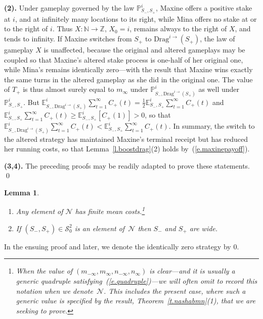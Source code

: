 \documentclass[letterpaper,11pt,oneside,reqno]{amsbook}
\newcommand{\PP}{\ensuremath{\mathbb{P}}}
\newcommand{\N}{\ensuremath{\mathbb{N}}}
\newcommand{\Z}{\ensuremath{\mathbb{Z}}}
\newcommand{\E}[0]{\mathbb{E}}
\numberwithin{figure}{chapter}
\newtheorem{lemma}[theorem]{Lemma}
\theoremstyle{definition}
\theoremstyle{definition}
\theoremstyle{definition}
\theoremstyle{definition}
\theoremstyle{definition}
\newcommand{\mc}{\mathcal}
\newcommand{\tis}{\mc{S}_0}
\newcommand\pgameplay[3]{\PP^{#3}_{#1,#2}}
\newcommand\egameplay[3]{\E^{#3}_{#1,#2}}
\newcommand{\drag}{\textrm{Drag}}
\begin{document}
{\bf (2).} Under gameplay governed by the law $\pgameplay{S_-}{S_+}{i}$, Maxine offers a positive stake at $i$, and at infinitely many locations to its right, while Mina offers no stake at or to the right of $i$.
Thus $X:\N \to \Z$, $X_0 = i$, remains always to the right of $X$, and tends to infinity. If Maxine switches from  $S_+$ to $\drag^{i\rightarrow}(S_+)$, the law of gameplay $X$ is unaffected, because the original and altered gameplays may be coupled so that Maxine's altered stake process is one-half of her original one, while Mina's remains identically zero---with the result that Maxine wins exactly the same turns in the altered gameplay as she did in the original one. The value of $T_+$ is thus almost surely equal to $m_\infty$
under 
  $\pgameplay{S_-}{\drag^{i\rightarrow}(S_+)}{i}$ as well under  $\pgameplay{S_-}{S_+}{i}$. But  
  $\egameplay{S_-}{\drag^{i\rightarrow}(S_+)}{i} \sum_{t=1}^\infty C_+(t) 
  = \tfrac{1}{2} \egameplay{S_-}{S_+}{i} \sum_{t=1}^\infty C_+(t) $ and $\egameplay{S_-}{S_+}{i} \sum_{t=1}^\infty C_+(t) \geq  \egameplay{S_-}{S_+}{i} [C_+(1)] > 0$, so that $\egameplay{S_-}{\drag^{i\rightarrow}(S_+)}{i} \sum_{t=1}^\infty C_+(t) <  \egameplay{S_-}{S_+}{i} \sum_{t=1}^\infty C_+(t)$. In summary, the switch to the altered strategy has maintained Maxine's terminal receipt but has reduced her running costs, so that Lemma~\ref{l.boostdrag}(2) holds by~(\ref{e.maxinepayoff}).
  
{\bf (3,4).} The preceding proofs may be readily adapted to prove these statements. \qed



\begin{lemma}\label{l.zeronotnash}
\leavevmode
\begin{enumerate}
\item Any element of $\mc{N}$ has finite mean costs.\footnote{When the value of $(m_{-\infty},m_\infty,n_{-\infty},n_\infty)$ is clear---and it is usually a generic quadruple satisfying~(\ref{e.quadruple})---we will often omit to record this notation when we denote~$\mc{N}$. This includes the present case, where such a generic value is specified by the result, Theorem~\ref{t.nashabmn}(1), that we are seeking to prove.}
\item 
If $(S_-,S_+) \in \tis^2$ is an element of~$\mc{N}$ then  $S_-$ and $S_+$ are wide.
\end{enumerate}
\end{lemma}
In the ensuing proof and later, we denote the identically zero strategy by $0$.
\end{document}
